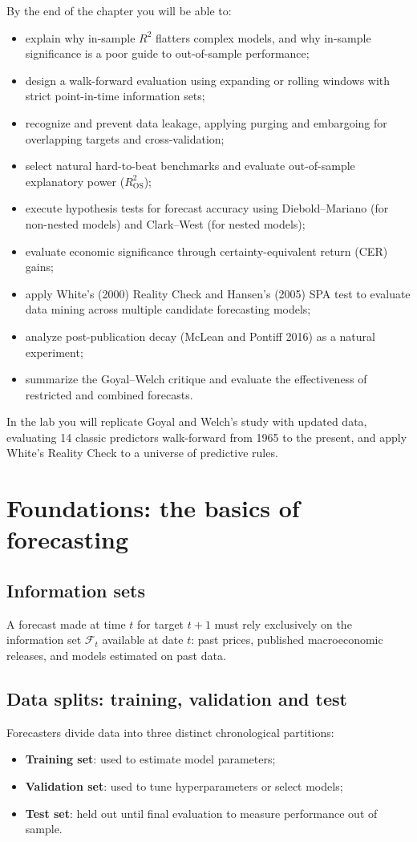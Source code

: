 By the end of the chapter you will be able to:
\begin{itemize}
  \item explain why in-sample $R^2$ flatters complex models, and why in-sample significance is a poor guide to out-of-sample performance;
  \item design a walk-forward evaluation using expanding or rolling windows with strict point-in-time information sets;
  \item recognize and prevent data leakage, applying purging and embargoing for overlapping targets and cross-validation;
  \item select natural hard-to-beat benchmarks and evaluate out-of-sample explanatory power ($R^2_{\text{OS}}$);
  \item execute hypothesis tests for forecast accuracy using Diebold--Mariano (for non-nested models) and Clark--West (for nested models);
  \item evaluate economic significance through certainty-equivalent return (CER) gains;
  \item apply White's (2000) Reality Check and Hansen's (2005) SPA test to evaluate data mining across multiple candidate forecasting models;
  \item analyze post-publication decay (McLean and Pontiff 2016) as a natural experiment;
  \item summarize the Goyal--Welch critique and evaluate the effectiveness of restricted and combined forecasts.
\end{itemize}

In the lab you will replicate Goyal and Welch's study with updated data, evaluating 14 classic predictors walk-forward from 1965 to the present, and apply White's Reality Check to a universe of predictive rules.

\section{Foundations: the basics of forecasting}
\label{sec:08-foundations}

\subsection{Information sets}
A forecast made at time $t$ for target $t+1$ must rely exclusively on the information set $\mathcal{F}_t$ available at date $t$: past prices, published macroeconomic releases, and models estimated on past data.

\subsection{Data splits: training, validation and test}
Forecasters divide data into three distinct chronological partitions:
\begin{itemize}
  \item \textbf{Training set}: used to estimate model parameters;
  \item \textbf{Validation set}: used to tune hyperparameters or select models;
  \item \textbf{Test set}: held out until final evaluation to measure performance out of sample.
\end{itemize}


